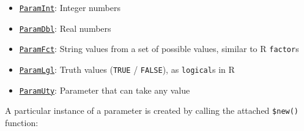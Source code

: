 \documentclass[]{article}
\newenvironment{Shaded}{}{}
\newcommand{\ControlFlowTok}[1]{\textcolor[rgb]{0.00,0.00,1.00}{#1}}
\newcommand{\DataTypeTok}[1]{#1}
\newcommand{\DecValTok}[1]{#1}
\newcommand{\KeywordTok}[1]{\textcolor[rgb]{0.00,0.00,1.00}{#1}}
\newcommand{\NormalTok}[1]{#1}
\newcommand{\OperatorTok}[1]{#1}
\newcommand{\OtherTok}[1]{\textcolor[rgb]{1.00,0.25,0.00}{#1}}
\newcommand{\StringTok}[1]{\textcolor[rgb]{0.00,0.50,0.50}{#1}}
\providecommand{\tightlist}{%
  \setlength{\itemsep}{0pt}\setlength{\parskip}{0pt}}
\renewenvironment{Shaded} {\begin{snugshade}\small} {\end{snugshade}}
\begin{document}
\begin{itemize}
\tightlist
\item
  \href{https://paradox.mlr-org.com/reference/ParamInt.html}{\texttt{ParamInt}}: Integer numbers
\item
  \href{https://paradox.mlr-org.com/reference/ParamDbl.html}{\texttt{ParamDbl}}: Real numbers
\item
  \href{https://paradox.mlr-org.com/reference/ParamFct.html}{\texttt{ParamFct}}: String values from a set of possible values, similar to R \texttt{factor}s
\item
  \href{https://paradox.mlr-org.com/reference/ParamLgl.html}{\texttt{ParamLgl}}: Truth values (\texttt{TRUE} / \texttt{FALSE}), as \texttt{logical}s in R
\item
  \href{https://paradox.mlr-org.com/reference/ParamUty.html}{\texttt{ParamUty}}: Parameter that can take any value
\end{itemize}

A particular instance of a parameter is created by calling the attached \texttt{\$new()} function:

\begin{Shaded}
\end{Shaded}
\end{document}
